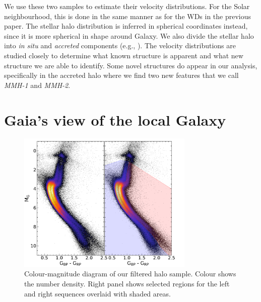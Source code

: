 We use these two samples to estimate their velocity distributions. For the Solar neighbourhood, this is done in the same manner as for the WDs in the previous paper. The stellar halo distribution is inferred in spherical coordinates instead, since it is more spherical in shape around Galaxy. We also divide the stellar halo into \textit{in situ} and \textit{accreted} components (e.g., \citealt{naidu:20}). The velocity distributions are studied closely to determine what known structure is apparent and what new structure we are able to identify. Some novel structures do appear in our analysis, specifically in the accreted halo where we find two new features that we call \textit{MMH-1} and \textit{MMH-2}.
\section{Gaia's view of the local Galaxy}\label{sec:p3-gaiaview}
\begin{figure}[t]
    \centering
    \includegraphics[width=0.75\textwidth]{images/GES_cmd.pdf}
    \caption{Colour-magnitude diagram of our filtered halo sample. Colour shows the number density. Right panel shows selected regions for the left and right sequences overlaid with shaded areas.} %
    \label{fig:halo_cmd}
\end{figure}
